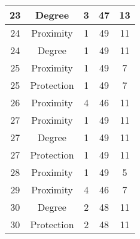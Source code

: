 \documentclass[results.tex]{subfiles}
\begin{document}
\begin{center}
\begin{tabular}{| c || c | c | c | c |}
            \hline
            23                      & Degree                       & 3                      & 47                      & 13                   \\
            \hline
            24                      & Proximity                    & 1                      & 49                      & 11                   \\
            \hline
            24                      & Degree                       & 1                      & 49                      & 11                   \\
            \hline
            25                      & Proximity                    & 1                      & 49                      & 7                    \\
            \hline
            25                      & Protection                   & 1                      & 49                      & 7                    \\
            \hline
            26                      & Proximity                    & 4                      & 46                      & 11                   \\
            \hline
            27                      & Proximity                    & 1                      & 49                      & 11                   \\
            \hline
            27                      & Degree                       & 1                      & 49                      & 11                   \\
            \hline
            27                      & Protection                   & 1                      & 49                      & 11                   \\
            \hline
            28                      & Proximity                    & 1                      & 49                      & 5                    \\
            \hline
            29                      & Proximity                    & 4                      & 46                      & 7                    \\
            \hline
            30                      & Degree                       & 2                      & 48                      & 11                   \\
            \hline
            30                      & Protection                   & 2                      & 48                      & 11                   \\

\end{tabular}
\end{center}
\end{document}

